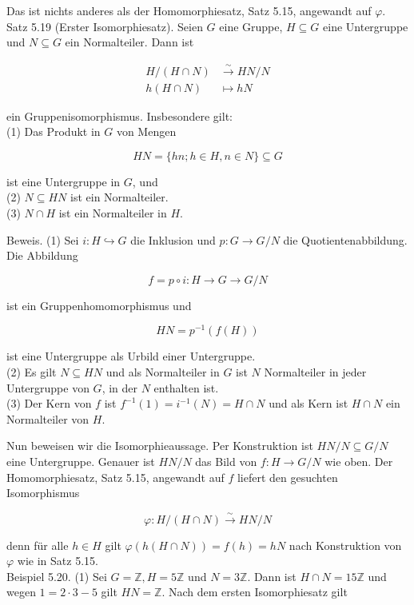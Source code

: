 \documentclass[10pt, letterpaper]{article}
\begin{document}
Das ist nichts anderes als der Homomorphiesatz, Satz 5.15, angewandt auf $\varphi$.\\
Satz 5.19 (Erster Isomorphiesatz). Seien $G$ eine Gruppe, $H \subseteq G$ eine Untergruppe und $N \subseteq G$ ein Normalteiler. Dann ist

$$
\begin{aligned}
H /(H \cap N) & \xrightarrow{\sim} H N / N \\
h(H \cap N) & \mapsto h N
\end{aligned}
$$

ein Gruppenisomorphismus. Insbesondere gilt:\\
(1) Das Produkt in $G$ von Mengen

$$
H N=\{h n ; h \in H, n \in N\} \subseteq G
$$

ist eine Untergruppe in $G$, und\\
(2) $N \subseteq H N$ ist ein Normalteiler.\\
(3) $N \cap H$ ist ein Normalteiler in $H$.

Beweis. (1) Sei $i: H \hookrightarrow G$ die Inklusion und $p: G \rightarrow G / N$ die Quotientenabbildung. Die Abbildung

$$
f=p \circ i: H \rightarrow G \rightarrow G / N
$$

ist ein Gruppenhomomorphismus und

$$
H N=p^{-1}(f(H))
$$

ist eine Untergruppe als Urbild einer Untergruppe.\\
(2) Es gilt $N \subseteq H N$ und als Normalteiler in $G$ ist $N$ Normalteiler in jeder Untergruppe von $G$, in der $N$ enthalten ist.\\
(3) Der Kern von $f$ ist $f^{-1}(1)=i^{-1}(N)=H \cap N$ und als Kern ist $H \cap N$ ein Normalteiler von $H$.

Nun beweisen wir die Isomorphieaussage. Per Konstruktion ist $H N / N \subseteq G / N$ eine Untergruppe. Genauer ist $H N / N$ das Bild von $f: H \rightarrow G / N$ wie oben. Der Homomorphiesatz, Satz 5.15, angewandt auf $f$ liefert den gesuchten Isomorphismus

$$
\varphi: H /(H \cap N) \xrightarrow{\sim} H N / N
$$

denn für alle $h \in H$ gilt $\varphi(h(H \cap N))=f(h)=h N$ nach Konstruktion von $\varphi$ wie in Satz 5.15.\\
Beispiel 5.20. (1) Sei $G=\mathbb{Z}, H=5 \mathbb{Z}$ und $N=3 \mathbb{Z}$. Dann ist $H \cap N=15 \mathbb{Z}$ und wegen $1=2 \cdot 3-5$ gilt $H N=\mathbb{Z}$. Nach dem ersten Isomorphiesatz gilt
\end{document}
